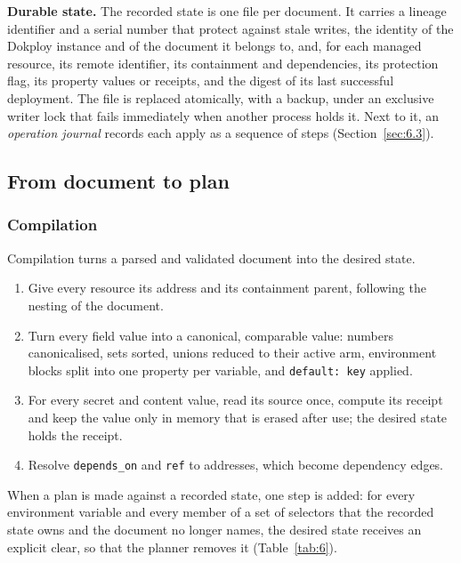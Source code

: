 \textbf{Durable state.} The recorded state is one file per document. It carries a lineage identifier and a
serial number that protect against stale writes, the identity of the Dokploy instance and of the
document it belongs to, and, for each managed resource, its remote identifier, its containment and
dependencies, its protection flag, its property values or receipts, and the digest of its last
successful deployment. The file is replaced atomically, with a backup, under an exclusive writer lock
that fails immediately when another process holds it. Next to it, an \emph{operation journal} records each
apply as a sequence of steps (Section~\ref{sec:6.3}).

\subsection{From document to plan}\label{sec:6.2}

\subsubsection*{Compilation}

Compilation turns a parsed and validated document into the desired state.

\begin{enumerate}
\def\labelenumi{\arabic{enumi}.}
\item
  Give every resource its address and its containment parent, following the nesting of the document.
\item
  Turn every field value into a canonical, comparable value: numbers canonicalised, sets sorted,
  unions reduced to their active arm, environment blocks split into one property per variable, and
  \texttt{default:\ key} applied.
\item
  For every secret and content value, read its source once, compute its receipt and keep the value
  only in memory that is erased after use; the desired state holds the receipt.
\item
  Resolve \texttt{depends\_on} and \texttt{ref} to addresses, which become dependency edges.
\end{enumerate}

When a plan is made against a recorded state, one step is added: for every environment variable and
every member of a set of selectors that the recorded state owns and the document no longer names, the
desired state receives an explicit clear, so that the planner removes it (Table~\ref{tab:6}).

